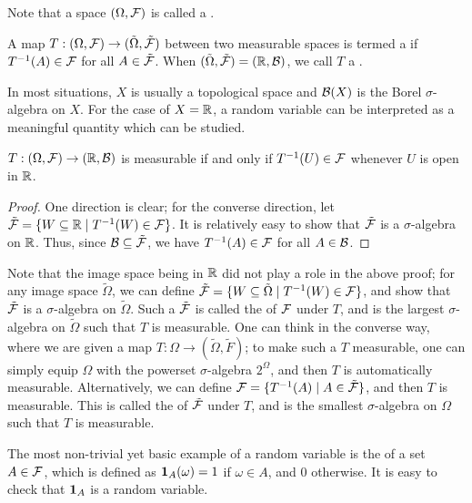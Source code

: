 Note that a space $(\Omega,\mathcal{F})$ is called a .
\begin{definition}
    A map $T:(\Omega,\mathcal{F}) \to (\tilde{\Omega},\tilde{\mathcal{F}})$ between two measurable spaces is termed a  if $T^{-1}(A) \in \mathcal{F}$ for all $A \in \tilde{\mathcal{F}}$. When $(\tilde{\Omega},\tilde{\mathcal{F}}) = (\mathbb{R},\mathcal{B})$, we call $T$ a .
\end{definition}
In most situations, $X$ is usually a topological space and $\mathcal{B}(X)$ is the Borel $\sigma$-algebra on $X$. For the case of $X = \mathbb{R}$, a random variable can be interpreted as a meaningful quantity which can be studied. 

\begin{proposition}
    $T:(\Omega,\mathcal{F}) \to (\mathbb{R},\mathcal{B})$ is measurable if and only if $T^{-1}(U) \in \mathcal{F}$ whenever $U$ is open in $\mathbb{R}$.
\end{proposition}
\begin{proof}
    One direction is clear; for the converse direction, let $\tilde{\mathcal{F}} = \{W \subseteq \mathbb{R} \mid T^{-1}(W) \in \mathcal{F}\}$. It is relatively easy to show that $\tilde{\mathcal{F}}$ is a $\sigma$-algebra on $\mathbb{R}$. Thus, since $\mathcal{B} \subseteq \tilde{\mathcal{F}}$, we have $T^{-1}(A) \in \mathcal{F}$ for all $A \in \mathcal{B}$.
\end{proof}

Note that the image space being in $\mathbb{R}$ did not play a role in the above proof; for any image space $\tilde{\Omega}$, we can define $\tilde{\mathcal{F}} = \{W \subseteq \tilde{\Omega} \mid T^{-1}(W) \in \mathcal{F}\}$, and show that $\tilde{\mathcal{F}}$ is a $\sigma$-algebra on $\tilde{\Omega}$. Such a $\tilde{\mathcal{F}}$ is called the  of $\mathcal{F}$ under $T$, and is the largest $\sigma$-algebra on $\tilde{\Omega}$ such that $T$ is measurable. One can think in the converse way, where we are given a map $T:\Omega \to (\tilde{\Omega},\tilde{F})$; to make such a $T$ measurable, one can simply equip $\Omega$ with the powerset $\sigma$-algebra $2^{\Omega}$, and then $T$ is automatically measurable. Alternatively, we can define $\mathcal{F} = \{T^{-1}(A) \mid A \in \tilde{\mathcal{F}}\}$, and then $T$ is measurable. This is called the  of $\tilde{\mathcal{F}}$ under $T$, and is the smallest $\sigma$-algebra on $\Omega$ such that $T$ is measurable.

The most non-trivial yet basic example of a random variable is the  of a set $A \in \mathcal{F}$, which is defined as $\textbf{1}_{A}(\omega) = 1$ if $\omega \in A$, and $0$ otherwise. It is easy to check that $\textbf{1}_{A}$ is a random variable.

